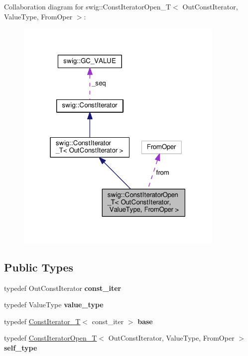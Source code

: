 Collaboration diagram for swig\+:\+:Const\+Iterator\+Open\+\_\+T$<$ Out\+Const\+Iterator, Value\+Type, From\+Oper $>$\+:
\nopagebreak
\begin{figure}[H]
\begin{center}
\leavevmode
\includegraphics[width=283pt]{classswig_1_1ConstIteratorOpen__T__coll__graph}
\end{center}
\end{figure}
\subsection*{Public Types}
\begin{DoxyCompactItemize}
\item 
typedef Out\+Const\+Iterator {\bfseries const\+\_\+iter}\hypertarget{classswig_1_1ConstIteratorOpen__T_a84f2cf663afb779a975ab4d586297a45}{}\label{classswig_1_1ConstIteratorOpen__T_a84f2cf663afb779a975ab4d586297a45}

\item 
typedef Value\+Type {\bfseries value\+\_\+type}\hypertarget{classswig_1_1ConstIteratorOpen__T_aa611a6ac65e84cf7e337725aed28e75b}{}\label{classswig_1_1ConstIteratorOpen__T_aa611a6ac65e84cf7e337725aed28e75b}

\item 
typedef \hyperlink{classswig_1_1ConstIterator__T}{Const\+Iterator\+\_\+T}$<$ const\+\_\+iter $>$ {\bfseries base}\hypertarget{classswig_1_1ConstIteratorOpen__T_a52d390b1946d53ee1bdeaa2c07a14567}{}\label{classswig_1_1ConstIteratorOpen__T_a52d390b1946d53ee1bdeaa2c07a14567}

\item 
typedef \hyperlink{classswig_1_1ConstIteratorOpen__T}{Const\+Iterator\+Open\+\_\+T}$<$ Out\+Const\+Iterator, Value\+Type, From\+Oper $>$ {\bfseries self\+\_\+type}\hypertarget{classswig_1_1ConstIteratorOpen__T_a82410c12b0c9bbf7e48a6f5c6be5ef6a}{}\label{classswig_1_1ConstIteratorOpen__T_a82410c12b0c9bbf7e48a6f5c6be5ef6a}

\end{DoxyCompactItemize}
